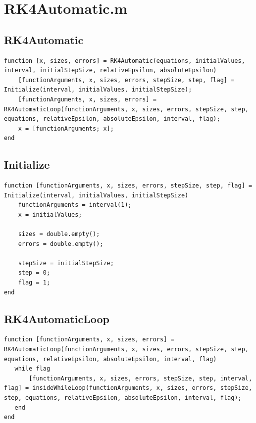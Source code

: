\section{RK4Automatic.m}
\subsection{RK4Automatic}
\begin{simplechar}
\begin{lstlisting}
function [x, sizes, errors] = RK4Automatic(equations, initialValues, interval, initialStepSize, relativeEpsilon, absoluteEpsilon)
    [functionArguments, x, sizes, errors, stepSize, step, flag] = Initialize(interval, initialValues, initialStepSize);
    [functionArguments, x, sizes, errors] = RK4AutomaticLoop(functionArguments, x, sizes, errors, stepSize, step, equations, relativeEpsilon, absoluteEpsilon, interval, flag);
    x = [functionArguments; x];
end
\end{lstlisting}
\end{simplechar}

\subsection{Initialize}
\begin{simplechar}
\begin{lstlisting}
function [functionArguments, x, sizes, errors, stepSize, step, flag] = Initialize(interval, initialValues, initialStepSize)
    functionArguments = interval(1);
    x = initialValues;

    sizes = double.empty();
    errors = double.empty();

    stepSize = initialStepSize;
    step = 0;
    flag = 1;
end
\end{lstlisting}
\end{simplechar}

\subsection{RK4AutomaticLoop}
\begin{simplechar}
\begin{lstlisting}
function [functionArguments, x, sizes, errors] = RK4AutomaticLoop(functionArguments, x, sizes, errors, stepSize, step, equations, relativeEpsilon, absoluteEpsilon, interval, flag)
   while flag
       [functionArguments, x, sizes, errors, stepSize, step, interval, flag] = insideWhileLoop(functionArguments, x, sizes, errors, stepSize, step, equations, relativeEpsilon, absoluteEpsilon, interval, flag);
   end
end
\end{lstlisting}
\end{simplechar}

